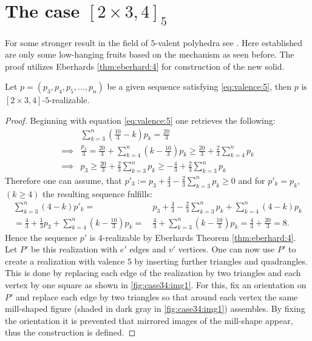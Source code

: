 \section{The case $[2 \times 3, 4]_5$}
For some stronger result in the field of $5$-valent polyhedra see \cite{trenkler1975face}. Here established are only some low-hanging fruits based on the mechanism as seen before. The proof utilizes Eberhards \autoref{thm:eberhard:4} for construction of the new solid.
\begin{theorem}
  Let $p = (p_3, p_4, p_5, \dots, p_n)$ be a given sequence satisfying \autoref{eq:valence:5}, then $p$ is $[2\times3, 4]$-$5$-realizable.
  \begin{proof}
    Beginning with equation \autoref{eq:valence:5} one retrieves the following:
    \begin{align*}
      &\sum_{k=3}^n \left( \frac{10}{3} - k \right) p_k = \frac{20}{3} \\
      \implies & \frac{p_3}{3} = \frac{20}{3} + \sum_{k=4}^n \left(k - \frac{10}{3} \right) p_k \geq \frac{20}{3} + \frac{2}{3} \sum_{k=4}^n p_k \\
      \implies & p_3 \geq \frac{20}{3} + \frac{2}{3} \sum_{k=3}^n p_k \geq - \frac{4}{3} + \frac{2}{3} \sum_{k=3}^n p_k
    \end{align*}
    Therefore one can assume, that $p'_3 := p_3 + \frac{4}{3} - \frac{2}{3} \sum_{k=3}^n p_k \geq 0$ and for $p'_k = p_k$, $(k\geq 4)$ the resulting sequence fulfills:
    \begin{align*}
      \sum_{k=3}^n (4 - k) p'_k =&~ p_3 + \frac{4}{3} - \frac{2}{3} \sum_{k=3}^n p_k + \sum_{k=4}^n (4 - k) p_k \\
      = \frac{4}{3} + \frac{1}{3} p_3 + \sum_{k=4}^n \left(k - \frac{10}{3} \right) p_k =&~ \frac{4}{3} + \sum_{k=3}^n \left(k - \frac{10}{3} \right) p_k = \frac{4}{3} + \frac{20}{3} = 8.
    \end{align*}
    Hence the sequence $p'$ is $4$-realizable by Eberhards Theorem \autoref{thm:eberhard:4}. Let $P'$ be this realization with $e'$ edges and $v'$ vertices. One can now use $P'$ to create a realization with valence $5$ by inserting further triangles and quadrangles. This is done by replacing each edge of the realization by two triangles and each vertex by one square as shown in \autoref{fig:case34:img1}. For this, fix an orientation on $P'$ and replace each edge by two triangles so that around each vertex the same mill-shaped figure (shaded in dark gray in \autoref{fig:case34:img1}) assembles. By fixing the orientation it is prevented that mirrored images of the mill-shape appear, thus the construction is defined.


\end{proof}
\end{theorem}
